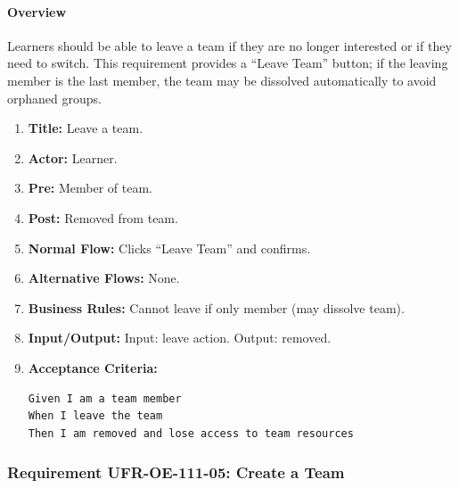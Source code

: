 \paragraph{Overview}
Learners should be able to leave a team if they are no longer interested or if they need to switch. This requirement provides a “Leave Team” button; if the leaving member is the last member, the team may be dissolved automatically to avoid orphaned groups.
\begin{enumerate}[label=\textbf{\arabic*.}]
\item \textbf{Title:} Leave a team.
\item \textbf{Actor:} Learner.
\item \textbf{Pre:} Member of team.
\item \textbf{Post:} Removed from team.
\item \textbf{Normal Flow:} Clicks “Leave Team” and confirms.
\item \textbf{Alternative Flows:} None.
\item \textbf{Business Rules:} Cannot leave if only member (may dissolve team).
\item \textbf{Input/Output:} Input: leave action. Output: removed.
\item \textbf{Acceptance Criteria:}
    \begin{verbatim}
Given I am a team member
When I leave the team
Then I am removed and lose access to team resources
    \end{verbatim}
\end{enumerate}

\subsubsection{Requirement UFR-OE-111-05: Create a Team}
